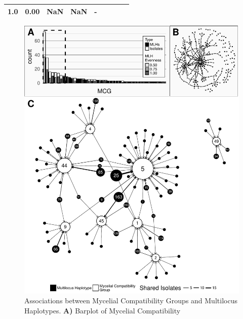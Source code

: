 \documentclass[fleqn,10pt,lineno]{wlpeerj} %
\theoremstyle{definition}
\theoremstyle{definition}
\theoremstyle{definition}
\theoremstyle{remark}
\begin{document}
\begin{longtable}[]{@{}crrrrllrl@{}}
\begin{minipage}[t]{0.05\columnwidth}
1.0\strut
\end{minipage} & \begin{minipage}[t]{0.11\columnwidth}\raggedright\strut
0.00\strut
\end{minipage} & \begin{minipage}[t]{0.06\columnwidth}\raggedright\strut
NaN\strut
\end{minipage} & \begin{minipage}[t]{0.06\columnwidth}\raggedleft\strut
NaN\strut
\end{minipage} & \begin{minipage}[t]{0.07\columnwidth}\raggedright\strut
-\strut
\end{minipage}\tabularnewline
\bottomrule
\end{longtable}

\begin{figure}
\centering
\includegraphics[width=1.00000\textwidth]{../../results/figures/publication/mcg-subgraph-with-context.pdf}
\caption{Associations between Mycelial Compatibility Groups and
Multilocus Haplotypes. \textbf{A)} Barplot of Mycelial Compatibility
}
\end{figure}
\end{document}
